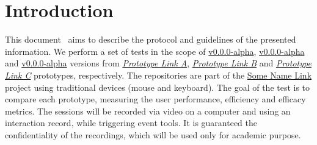 
\section{Introduction}
\label{sec:sec001}

This document~\cite{francisco_maria_calisto_2019_2639038} aims to describe the protocol and guidelines of the presented information. We perform a set of tests in the scope of \hyperlink{}{v0.0.0-alpha}, \hyperlink{}{v0.0.0-alpha} and \hyperlink{}{v0.0.0-alpha} versions from {\it \hyperlink{}{Prototype Link A}}, {\it \hyperlink{}{Prototype Link B}} and {\it \hyperlink{}{Prototype Link C}} prototypes, respectively. The repositories are part of the \hyperlink{}{Some Name Link} project using traditional devices (mouse and keyboard). The goal of the test is to compare each prototype, measuring the user performance, efficiency and efficacy metrics. The sessions will be recorded via video on a computer and using an interaction record, while triggering event tools. It is guaranteed the confidentiality of the recordings, which will be used only for academic purpose.